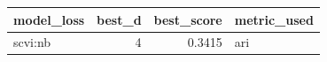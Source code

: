 \begin{tabular}{lrrl}
\toprule
model\_loss & best\_d & best\_score & metric\_used \\
\midrule
scvi:nb & 4 & 0.3415 & ari \\
\bottomrule
\end{tabular}
